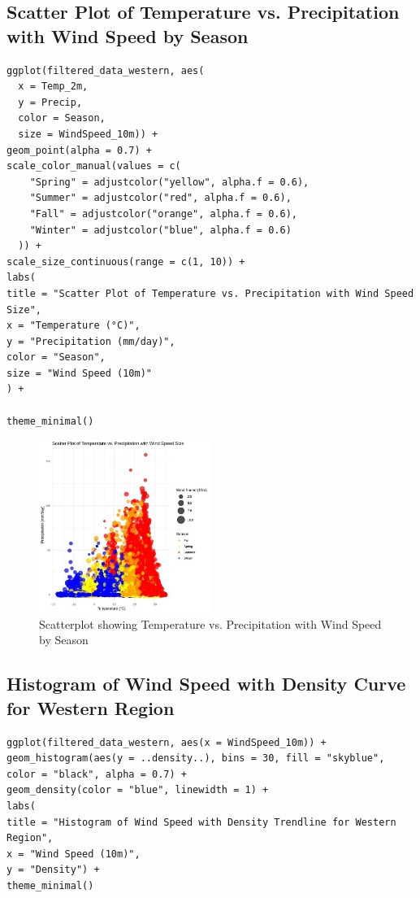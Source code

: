 \subsection*{Scatter Plot of Temperature vs. Precipitation with Wind Speed by Season}

\begin{verbatim}
ggplot(filtered_data_western, aes(
  x = Temp_2m, 
  y = Precip, 
  color = Season, 
  size = WindSpeed_10m)) +
geom_point(alpha = 0.7) +
scale_color_manual(values = c(
    "Spring" = adjustcolor("yellow", alpha.f = 0.6),
    "Summer" = adjustcolor("red", alpha.f = 0.6),
    "Fall" = adjustcolor("orange", alpha.f = 0.6),
    "Winter" = adjustcolor("blue", alpha.f = 0.6)
  )) +
scale_size_continuous(range = c(1, 10)) +
labs(
title = "Scatter Plot of Temperature vs. Precipitation with Wind Speed Size",
x = "Temperature (°C)",
y = "Precipitation (mm/day)",
color = "Season",
size = "Wind Speed (10m)"
) +

theme_minimal()
\end{verbatim}

\begin{figure}[h]
    \centering
    \includegraphics[width=0.5\textwidth]{figures/scatter_west.jpg}
    \caption{Scatterplot showing Temperature vs. Precipitation with Wind Speed by Season}
    \label{fig:scatter_temp_precip_wind}
\end{figure}

\subsection*{Histogram of Wind Speed with Density Curve for Western Region}

\begin{verbatim}
ggplot(filtered_data_western, aes(x = WindSpeed_10m)) +
geom_histogram(aes(y = ..density..), bins = 30, fill = "skyblue", 
color = "black", alpha = 0.7) + 
geom_density(color = "blue", linewidth = 1) + 
labs(
title = "Histogram of Wind Speed with Density Trendline for Western Region",
x = "Wind Speed (10m)",
y = "Density") +
theme_minimal()
\end{verbatim}


